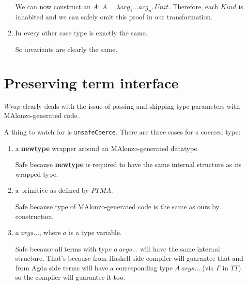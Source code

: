 \begin{enumerate}
We can now construct an \(A\): \(A = \lambda arg_1 \ldots arg_n.\ Unit\). Therefore, each \(Kind\)
is inhabited and we can safely omit this proof in our transformation.

\item In every other case type is exactly the same.

So invariants are clearly the same.
\end{enumerate}

\section{Preserving term interface}

\(Wrap\) clearly deals with the issue of passing and skipping type parameters with
MAlonzo-generated code.

A thing to watch for is \texttt{unsafeCoerce}.  There are three cases for a coerced type:
\begin{enumerate}
\item a \textbf{newtype} wrapper around an MAlonzo-generated datatype.

   Safe because \textbf{newtype} is required to have the same
   internal structure as its wrapped type.

\item a primitive as defined by \(PTMA\).

   Safe because type of MAlonzo-generated code is the same as ours by construction.

\item \(a\ args\ldots\), where \(a\) is a type variable.

   Safe because all terms with type \(a\ args\ldots\) will have the same internal
   structure. That's because from Haskell side compiler will guarantee that and
   from Agda side terms will have a corresponding type \(A\ args\ldots\) (via \(\Gamma\) in \(TT\))
   so the compiler will guarantee it too.
\end{enumerate}

